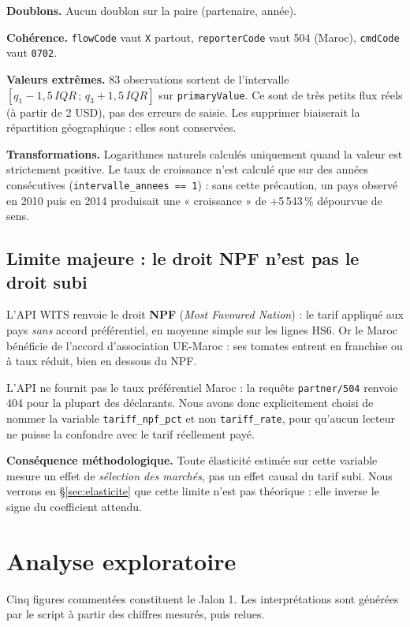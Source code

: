 \documentclass[11pt,a4paper]{article}
\begin{document}
\textbf{Doublons.} Aucun doublon sur la paire (partenaire, année).

\textbf{Cohérence.} \texttt{flowCode} vaut \texttt{X} partout, \texttt{reporterCode}
vaut 504 (Maroc), \texttt{cmdCode} vaut \texttt{0702}.

\textbf{Valeurs extrêmes.} 83 observations sortent de l'intervalle
$[q_1 - 1{,}5\,IQR\,;\,q_3 + 1{,}5\,IQR]$ sur \texttt{primaryValue}. Ce sont de très
petits flux réels (à partir de 2 USD), pas des erreurs de saisie. Les supprimer
biaiserait la répartition géographique : elles sont conservées.

\textbf{Transformations.} Logarithmes naturels calculés uniquement quand la valeur est
strictement positive. Le taux de croissance n'est calculé que sur des années
consécutives (\texttt{intervalle\_annees == 1}) : sans cette précaution, un pays
observé en 2010 puis en 2014 produisait une « croissance » de +5\,543\,\% dépourvue de
sens.

\subsection{Limite majeure : le droit NPF n'est pas le droit subi}\label{sec:limite-npf}

L'API WITS renvoie le droit \textbf{NPF} (\emph{Most Favoured Nation}) : le tarif
appliqué aux pays \emph{sans} accord préférentiel, en moyenne simple sur les lignes
HS6. Or le Maroc bénéficie de l'accord d'association UE-Maroc : ses tomates entrent en
franchise ou à taux réduit, bien en dessous du NPF.

L'API ne fournit pas le taux préférentiel Maroc : la requête
\texttt{partner/504} renvoie 404 pour la plupart des déclarants. Nous avons donc
explicitement choisi de nommer la variable \texttt{tariff\_npf\_pct} et non
\texttt{tariff\_rate}, pour qu'aucun lecteur ne puisse la confondre avec le tarif
réellement payé.

\textbf{Conséquence méthodologique.} Toute élasticité estimée sur cette variable
mesure un effet de \emph{sélection des marchés}, pas un effet causal du tarif subi.
Nous verrons en §\ref{sec:elasticite} que cette limite n'est pas théorique : elle
inverse le signe du coefficient attendu.

\section{Analyse exploratoire}\label{sec:eda}

Cinq figures commentées constituent le Jalon 1. Les interprétations sont générées par
le script à partir des chiffres mesurés, puis relues.
\end{document}

